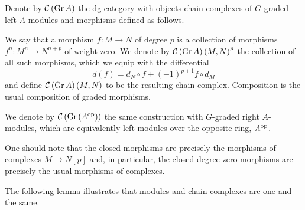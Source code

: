 \begin{definition}
  Denote by \(\mathcal{C}\left(\operatorname{Gr}A\right)\) the dg-category with objects chain complexes of \(G\)-graded left \(A\)-modules and morphisms defined as follows.
  
  We say that a morphism \(f \colon M \to N\) of degree \(p\) is a collection of morphisms \(f^n \colon M^n \to N^{n+p}\) of weight zero.
  We denote by \(\mathcal{C}\left(\operatorname{Gr}A\right)\left(M,N\right)^p\) the collection of all such morphisms, which we equip with the differential
  \[d(f) = d_N \circ f + (-1)^{p+1}f \circ d_M\]
  and define \(\mathcal{C}\left(\operatorname{Gr}A\right)(M,N)\) to be the resulting chain complex.
  Composition is the usual composition of graded morphisms.

  We denote by \(\mathcal{C}\left(\operatorname{Gr}\left(A^{{\operatorname{op}}}\right)\right)\) the same construction with \(G\)-graded right \(A\)-modules, which are equivalently left modules over the opposite ring, \(A^{\operatorname{op}}\).
\end{definition}

\begin{remark}
  One should note that the closed morphisms are precisely the morphisms of complexes \(M \to N[p]\) and, in particular, the closed degree zero morphisms are precisely the usual morphisms of complexes.
\end{remark}

The following lemma illustrates that modules and chain complexes are one and the same.

